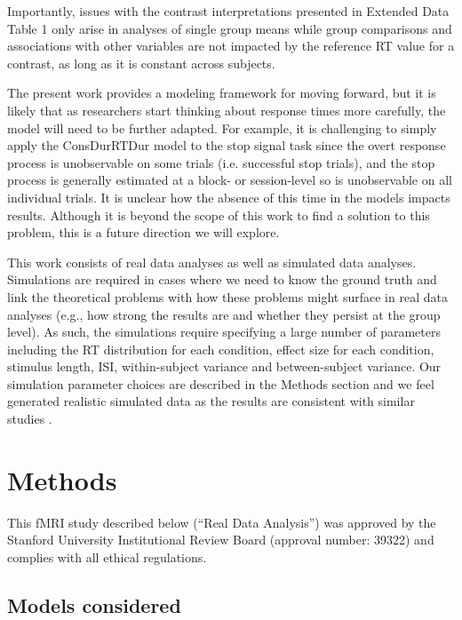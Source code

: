 \documentclass[sn-mathphys,Numbered, super, referee, lineno]{sn-jnl}
\begin{document}
Importantly, issues with the contrast interpretations presented in Extended Data Table 1 only arise in analyses of single group means while group comparisons and associations with other variables are not impacted by the reference RT value for a contrast, as long as it is constant across subjects.




 
The present work provides a modeling framework for moving forward, but it is likely that as researchers start thinking about response times more carefully, the model will need to be further adapted. For example, it is challenging to simply apply the ConsDurRTDur model to the stop signal task since the overt response process is unobservable on some trials (i.e. successful stop trials), and the stop process is generally estimated at a block- or session-level so is unobservable on all individual trials. It is unclear how the absence of this time in the models impacts results. Although it is beyond the scope of this work to find a solution to this problem, this is a future direction we will explore.


This work consists of real data analyses as well as simulated data analyses.  Simulations are required in cases where we need to know the ground truth and link the theoretical problems with how these problems might surface in real data analyses (e.g., how strong the results are and whether they persist at the group level). As such, the simulations require specifying a large number of parameters including the RT distribution for each condition, effect size for each condition, stimulus length, ISI,  within-subject variance and between-subject variance.  Our simulation parameter choices are described in the Methods section and we feel generated realistic simulated data as the results are consistent with similar studies  \citep{yarkoni_bold_2009, brown_medial_2011, grinband_dorsal_2011}. 

\section*{Methods}
This fMRI study described below (``Real Data Analysis'') was approved by the Stanford University Institutional Review Board (approval number: 39322) and complies with all ethical regulations.
\subsection*{Models considered}
\end{document}
